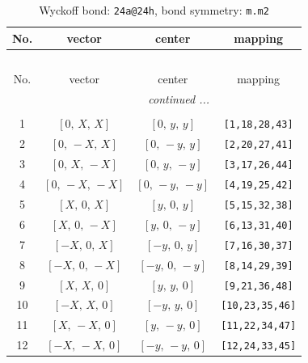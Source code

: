 \documentclass[fleqn,8pt]{jsarticle}
\begin{document}
\begin{longtable}{cccc}
\caption{Wyckoff bond: {\tt 24a@24h}, bond symmetry: {\tt m.m2}}
 \\
 \hline \hline
No. & vector & center & mapping \\ \hline \endfirsthead

\multicolumn{3}{l}{\tablename\ \thetable{}} \\
 \hline \hline
No. & vector & center & mapping \\ \hline \endhead

 \hline \hline
\multicolumn{3}{r}{\footnotesize\it continued ...} \\ \endfoot

 \hline \hline
\multicolumn{3}{r}{} \\ \endlastfoot

1 & $\left[ 0,\, X,\, X \right]$ & $\left[ 0,\, y,\, y \right]$ & {\tt [1,18,28,43]} \\ \hline
2 & $\left[ 0,\, - X,\, X \right]$ & $\left[ 0,\, - y,\, y \right]$ & {\tt [2,20,27,41]} \\ \hline
3 & $\left[ 0,\, X,\, - X \right]$ & $\left[ 0,\, y,\, - y \right]$ & {\tt [3,17,26,44]} \\ \hline
4 & $\left[ 0,\, - X,\, - X \right]$ & $\left[ 0,\, - y,\, - y \right]$ & {\tt [4,19,25,42]} \\ \hline
5 & $\left[ X,\, 0,\, X \right]$ & $\left[ y,\, 0,\, y \right]$ & {\tt [5,15,32,38]} \\ \hline
6 & $\left[ X,\, 0,\, - X \right]$ & $\left[ y,\, 0,\, - y \right]$ & {\tt [6,13,31,40]} \\ \hline
7 & $\left[ - X,\, 0,\, X \right]$ & $\left[ - y,\, 0,\, y \right]$ & {\tt [7,16,30,37]} \\ \hline
8 & $\left[ - X,\, 0,\, - X \right]$ & $\left[ - y,\, 0,\, - y \right]$ & {\tt [8,14,29,39]} \\ \hline
9 & $\left[ X,\, X,\, 0 \right]$ & $\left[ y,\, y,\, 0 \right]$ & {\tt [9,21,36,48]} \\ \hline
10 & $\left[ - X,\, X,\, 0 \right]$ & $\left[ - y,\, y,\, 0 \right]$ & {\tt [10,23,35,46]} \\ \hline
11 & $\left[ X,\, - X,\, 0 \right]$ & $\left[ y,\, - y,\, 0 \right]$ & {\tt [11,22,34,47]} \\ \hline
12 & $\left[ - X,\, - X,\, 0 \right]$ & $\left[ - y,\, - y,\, 0 \right]$ & {\tt [12,24,33,45]} \\
\end{longtable}
\renewcommand{\arraystretch}{1.2}
\end{document}
